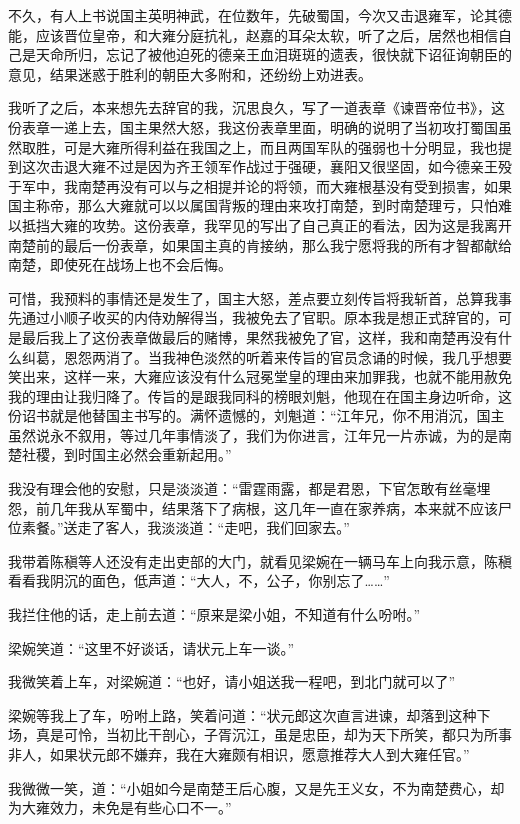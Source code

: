 不久，有人上书说国主英明神武，在位数年，先破蜀国，今次又击退雍军，论其德能，应该晋位皇帝，和大雍分庭抗礼，赵嘉的耳朵太软，听了之后，居然也相信自己是天命所归，忘记了被他迫死的德亲王血泪斑斑的遗表，很快就下诏征询朝臣的意见，结果迷惑于胜利的朝臣大多附和，还纷纷上劝进表。

我听了之后，本来想先去辞官的我，沉思良久，写了一道表章《谏晋帝位书》，这份表章一递上去，国主果然大怒，我这份表章里面，明确的说明了当初攻打蜀国虽然取胜，可是大雍所得利益在我国之上，而且两国军队的强弱也十分明显，我也提到这次击退大雍不过是因为齐王领军作战过于强硬，襄阳又很坚固，如今德亲王殁于军中，我南楚再没有可以与之相提并论的将领，而大雍根基没有受到损害，如果国主称帝，那么大雍就可以以属国背叛的理由来攻打南楚，到时南楚理亏，只怕难以抵挡大雍的攻势。这份表章，我罕见的写出了自己真正的看法，因为这是我离开南楚前的最后一份表章，如果国主真的肯接纳，那么我宁愿将我的所有才智都献给南楚，即使死在战场上也不会后悔。

可惜，我预料的事情还是发生了，国主大怒，差点要立刻传旨将我斩首，总算我事先通过小顺子收买的内侍劝解得当，我被免去了官职。原本我是想正式辞官的，可是最后我上了这份表章做最后的赌博，果然我被免了官，这样，我和南楚再没有什么纠葛，恩怨两消了。当我神色淡然的听着来传旨的官员念诵的时候，我几乎想要笑出来，这样一来，大雍应该没有什么冠冕堂皇的理由来加罪我，也就不能用赦免我的理由让我归降了。传旨的是跟我同科的榜眼刘魁，他现在在国主身边听命，这份诏书就是他替国主书写的。满怀遗憾的，刘魁道：“江年兄，你不用消沉，国主虽然说永不叙用，等过几年事情淡了，我们为你进言，江年兄一片赤诚，为的是南楚社稷，到时国主必然会重新起用。”

我没有理会他的安慰，只是淡淡道：“雷霆雨露，都是君恩，下官怎敢有丝毫埋怨，前几年我从军蜀中，结果落下了病根，这几年一直在家养病，本来就不应该尸位素餐。”送走了客人，我淡淡道：“走吧，我们回家去。”

我带着陈稹等人还没有走出吏部的大门，就看见梁婉在一辆马车上向我示意，陈稹看看我阴沉的面色，低声道：“大人，不，公子，你别忘了……”

我拦住他的话，走上前去道：“原来是梁小姐，不知道有什么吩咐。”

梁婉笑道：“这里不好谈话，请状元上车一谈。”

我微笑着上车，对梁婉道：“也好，请小姐送我一程吧，到北门就可以了”

梁婉等我上了车，吩咐上路，笑着问道：“状元郎这次直言进谏，却落到这种下场，真是可怜，当初比干剖心，子胥沉江，虽是忠臣，却为天下所笑，都只为所事非人，如果状元郎不嫌弃，我在大雍颇有相识，愿意推荐大人到大雍任官。”

我微微一笑，道：“小姐如今是南楚王后心腹，又是先王义女，不为南楚费心，却为大雍效力，未免是有些心口不一。”

